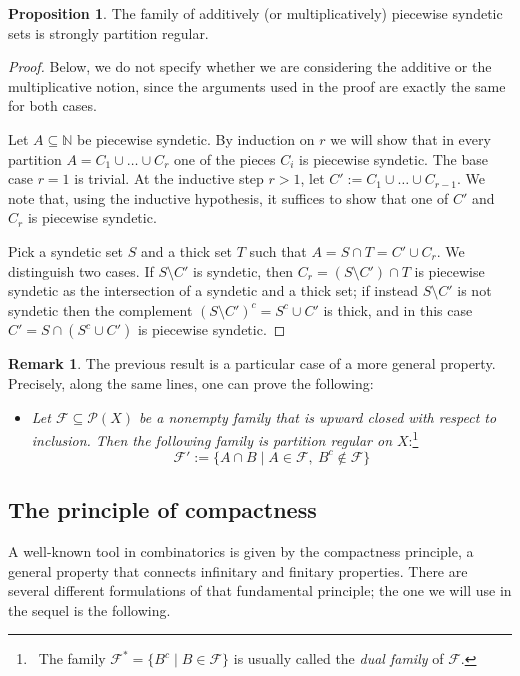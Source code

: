 \documentclass[a4paper,oneside]{article}
\newcommand{\N}{\mathbb{N}}
\newcommand{\F}{\mathcal{F}}
\theoremstyle{definition}
\newtheorem{remark}[theorem]{Remark}
\newtheorem{proposition}[theorem]{Proposition}
\theoremstyle{named}
\begin{document}
\begin{proposition}\label{PRofPS} 
The family of additively (or multiplicatively) piecewise syndetic sets
is strongly partition regular.
\end{proposition}

\begin{proof} 
Below, we do not specify whether we are considering the additive or the multiplicative notion, 
since the arguments used in the proof are exactly the same for both cases.

Let $A\subseteq\N$ be piecewise syndetic.
By induction on $r$ we will show that in every
partition $A=C_1\cup\ldots\cup C_r$ one of the pieces $C_i$ is piecewise syndetic.
The base case $r=1$ is trivial.
At the inductive step $r>1$, let $C':=C_1\cup\ldots\cup C_{r-1}$.
We note that, using the inductive hypothesis, it suffices to show that one 
of $C'$ and $C_r$ is piecewise syndetic.

Pick a syndetic set $S$ and a thick set $T$ such that $A=S\cap T=C'\cup C_r$.
We distinguish two cases.
If $S\setminus C'$ is syndetic, then 
$C_r=(S\setminus C')\cap T$ is piecewise syndetic as the intersection of a syndetic and a thick set;
if instead $S\setminus C'$ is not syndetic then the complement 
$(S\setminus C')^c=S^c\cup C'$ is thick, and in this case
$C'=S\cap(S^c\cup C')$ is piecewise syndetic.
\end{proof}



\begin{remark}
{\rm The previous result is a particular case of a more general property.
Precisely, along the same lines, one can prove the following:
\begin{itemize}
\item
\emph{Let $\F\subseteq\mathcal{P}(X)$ be a nonempty family 
that is upward closed with respect to inclusion. Then the 
following family is partition regular on $X$}:\footnote
{~The family $\F^*=\{B^c\mid B\in\F\}$ is usually called the \emph{dual family} of $\F$.}
$$\mathcal{F}':=\{A\cap B\mid A\in\mathcal{F},\ B^c\notin\mathcal{F}\}$$
\end{itemize}}
\end{remark}

\subsection{The principle of compactness}

\smallskip
A well-known tool in combinatorics is given by the compactness principle,
a general property that connects infinitary and finitary properties.
There are several different formulations of that fundamental principle;
the one we will use in the sequel is the following.
\end{document}

